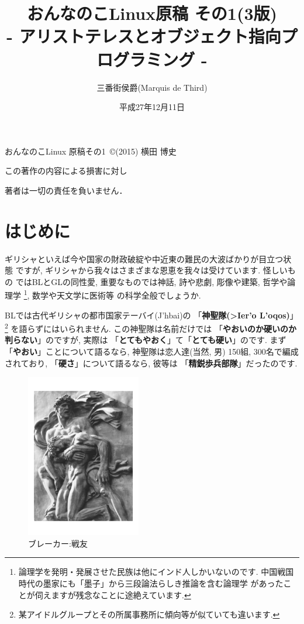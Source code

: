 \documentclass[b5j,8pt,twocolumn]{ltjsarticle}
\title{おんなのこLinux原稿 その1(3版)\\
- アリストテレスとオブジェクト指向プログラミング -}
\author{三番街侯爵(Marquis de Third)}
\date{
平成27年12月11日
 }
\newcommand{\textgreek}[1]{\begingroup\fontencoding{LGR}\selectfont#1\endgroup}
\begin{document}
\maketitle



おんなのこLinux 原稿その1~\copyright (2015) 横田 博史\par

この著作の内容による損害に対し

著者は一切の責任を負いません．
\clearpage
\newpage
\setcounter{page}{1}
\section{はじめに}

ギリシャといえば今や国家の財政破綻や中近東の難民の大波ばかりが目立つ状態
ですが, ギリシャから我々はさまざまな恩恵を我々は受けています. 怪しいもの
ではBLとGLの同性愛, 重要なものでは神話, 詩や悲劇, 彫像や建築, 哲学や論理学
\footnote{論理学を発明・発展させた民族は他にインド人しかいないのです.
 中国戦国時代の墨家にも「墨子」\cite{墨子}から三段論法らしき推論を含む論理学
があったことが伺えますが残念なことに途絶えています.}, 数学や天文学に医術等
の科学全般でしょうか.
\newline

BLでは古代ギリシャの都市国家テーバイ(\textgreek{J'hbai})の
「\textbf{神聖隊(\textgreek{>Ier'o L'oqos})}」
\footnote{某アイドルグループとその所属事務所に傾向等が似ていても違います.}
を語らずにはいられません. この神聖隊は名前だけでは
「\textbf{やおいのか硬いのか判らない}」のですが, 実際は
「\textbf{とてもやおく}」て「\textbf{とても硬い}」のです. まず
「\textbf{やおい}」ことについて語るなら, 神聖隊は恋人達(当然, 男)
150組, 300名で編成されており, 「\textbf{硬さ}」について語るなら, 彼等は
「\textbf{精鋭歩兵部隊}」だったのです.
\newline
 
 
\begin{figure}
\includegraphics[width=5cm]{arno_breker_kameradschaft.pdf}
\caption{ブレーカー:戦友}
\label{fig:breker2}
\end{figure}
\end{document}

